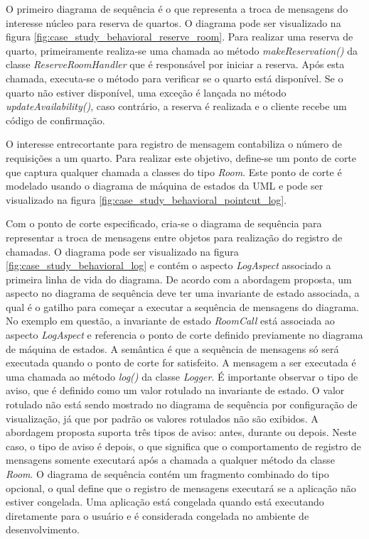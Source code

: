 O primeiro diagrama de sequência é o que representa a troca de mensagens do interesse núcleo para reserva de quartos. O diagrama pode ser visualizado
na figura \ref{fig:case_study_behavioral_reserve_room}. Para realizar uma reserva de quarto, primeiramente realiza-se uma chamada ao método
\textit{makeReservation()} da classe \textit{ReserveRoomHandler} que é responsável por iniciar a reserva. Após esta chamada, executa-se o método
para verificar se o quarto está disponível. Se o quarto não estiver disponível, uma exceção é lançada no método \textit{updateAvailability()}, caso
contrário, a reserva é realizada e o cliente recebe um código de confirmação.
  
O interesse entrecortante para registro de mensagem contabiliza o número de requisições a um quarto. Para realizar este objetivo, define-se um ponto
de corte que captura qualquer chamada a classes do tipo \textit{Room}. Este ponto de corte é modelado usando o diagrama de máquina de estados da UML e 
pode ser visualizado na figura \ref{fig:case_study_behavioral_pointcut_log}. 

Com o ponto de corte especificado, cria-se o diagrama de sequência para representar a troca de mensagens entre objetos para realização do registro de
chamadas. O diagrama pode ser visualizado na figura \ref{fig:case_study_behavioral_log} e contém o aspecto \textit{LogAspect} associado a primeira linha de vida do diagrama. De acordo com a
abordagem proposta, um aspecto no diagrama de sequência deve ter uma invariante de estado associada, a qual é o gatilho 
para começar a executar a sequência de mensagens do diagrama. No exemplo em questão, a invariante de estado \textit{RoomCall} está associada ao
aspecto \textit{LogAspect} e referencia o ponto de corte definido previamente no diagrama de máquina de estados. A semântica é que 
a sequência de mensagens só será executada quando o ponto de corte for satisfeito. A mensagem a ser executada
é uma chamada ao método \textit{log()} da classe \textit{Logger}. É importante observar o tipo de aviso, que é definido como um valor rotulado na
invariante de estado. O valor rotulado não está sendo mostrado no diagrama de sequência por configuração de visualização, já que por padrão os valores 
rotulados não são exibidos. A abordagem proposta suporta três tipos de aviso: antes, durante ou depois. Neste caso, o
tipo de aviso é depois, o que significa que o comportamento de registro de mensagens somente executará após a chamada a qualquer método da classe
\textit{Room}. O diagrama de sequência contém um fragmento combinado do tipo opcional, o qual define que o registro de mensagens executará se a
aplicação não estiver congelada. Uma aplicação está congelada quando está executando diretamente para o usuário e é considerada congelada no ambiente
de desenvolvimento.

